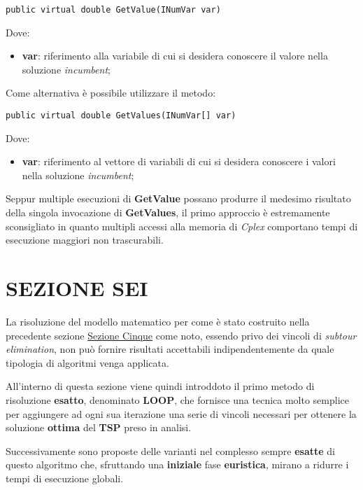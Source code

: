 \documentclass[11pt]{article}
\begin{document}
\begin{lstlisting}
public virtual double GetValue(INumVar var)
\end{lstlisting}

Dove:

\begin{itemize}
\item \textbf{var}: riferimento alla variabile di cui si desidera conoscere il valore nella soluzione \textit{incumbent};
\end{itemize}

Come alternativa è possibile utilizzare il metodo:

\begin{lstlisting}
public virtual double GetValues(INumVar[] var)
\end{lstlisting}

Dove:

\begin{itemize}
    \item \textbf{var}: riferimento al vettore di variabili di cui si desidera conoscere i valori nella soluzione \textit{incumbent};
\end{itemize}

Seppur multiple esecuzioni di \textbf{GetValue} possano produrre il medesimo risultato della singola invocazione di \textbf{GetValues}, il primo approccio è estremamente sconsigliato in quanto multipli accessi alla memoria di \textit{Cplex} comportano tempi di esecuzione maggiori non trascurabili.

\newpage

\section*{SEZIONE SEI}
\label{sec:SezioneSeiS}

La risoluzione del modello matematico per come è stato costruito nella precedente sezione \hyperref[sec:SezioneCinqueS]{Sezione Cinque} come noto, essendo privo dei vincoli di \textit{subtour elimination}, non può fornire risultati accettabili indipendentemente da quale tipologia di algoritmi venga applicata.

All'interno di questa sezione viene quindi introddoto il primo metodo di risoluzione \textbf{esatto}, denominato \textbf{LOOP}, che fornisce una tecnica molto semplice per aggiungere ad ogni sua iterazione una serie di vincoli necessari per ottenere la soluzione \textbf{ottima} del \textbf{TSP} preso in analisi.

Successivamente sono proposte delle varianti nel complesso sempre \textbf{esatte} di questo algoritmo che, sfruttando una \textbf{iniziale} fase \textbf{euristica}, mirano a ridurre i tempi di esecuzione globali.
\end{document}
